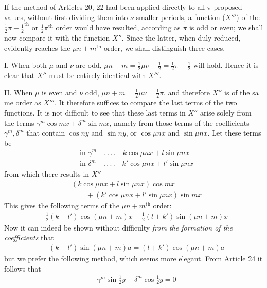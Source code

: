 \begingroup
\renewcommand{\arraystretch}{1.45}
If the method of Articles 20, 22 had been applied directly to all $\pi$ proposed values, without first dividing them into $\nu$ smaller periods, a function ($X'''$) of the $\tfrac12\pi-\tfrac12^{\mathrm{th}}$ or $\tfrac12\pi^{\mathrm{th}}$ order would have resulted, according as $\pi$ is odd or even; we shall now compare it with the function $X''$. Since the latter, when duly reduced, evidently reaches the $\mu n+m^{\mathrm{th}}$ order, we shall distinguish three cases.

I. When both $\mu$ and $\nu$ are odd, $\mu n+m=\tfrac12\mu\nu-\tfrac12=\tfrac12\pi-\tfrac12$ will hold. Hence it is clear that $X''$ must be entirely identical with $X'''$.

II. When $\mu$ is even and $\nu$ odd, $\mu n+m=\tfrac12\mu\nu=\tfrac12\pi$, and therefore $X''$ is of the sa%
me order as $X'''$. It therefore suffices to compare the last terms of the two functions. It is not difficult to see that these last terms in $X''$ arise solely from the terms $\gamma^m\cos mx+\delta^m\sin mx$, namely from those terms of the coefficients $\gamma^m,\delta^m$ that contain $\cos ny$ and $\sin ny$, or $\cos\mu nx$ and $\sin\mu nx$. Let these terms be
\[
\begin{aligned}
&\text{in }\gamma^m\quad.\,.\,.\,.\quad k\cos\mu nx+l\sin\mu nx\\[5pt]
&\text{in }\delta^m\quad.\,.\,.\,.\quad k'\cos\mu nx+l'\sin\mu nx
\end{aligned}
\]
from which there results in $X''$
\[
\begin{aligned}
&(k\cos\mu nx+l\sin\mu nx)\cos mx\\[5pt]
&\qquad{}+(k'\cos\mu nx+l'\sin\mu nx)\sin mx
\end{aligned}
\]
This gives the following terms of the $\mu n+m^{\mathrm{th}}$ order:
\[
\begin{aligned}
&\tfrac12(k-l')\cos(\mu n+m)x+\tfrac12(l+k')\sin(\mu n+m)x
\end{aligned}
\]
Now it can indeed be shown without difficulty \textit{from the formation of the coefficients} that
\[
\begin{aligned}
&(k-l')\sin(\mu n+m)a=(l+k')\cos(\mu n+m)a
\end{aligned}
\]
but we prefer the following method, which seems more elegant. From Article 24 it follows that
\[
\begin{aligned}
&\gamma^m\sin\tfrac12y-\delta^m\cos\tfrac12y=0
\end{aligned}
\]
